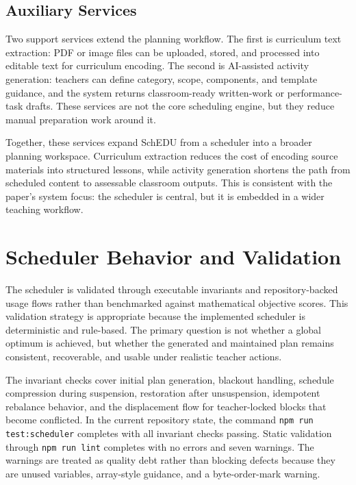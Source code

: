 \documentclass[conference]{IEEEtran}
\begin{document}
\subsection{Auxiliary Services}

Two support services extend the planning workflow. The first is curriculum text
extraction: PDF or image files can be uploaded, stored, and processed into editable
text for curriculum encoding. The second is AI-assisted activity generation:
teachers can define category, scope, components, and template guidance, and the
system returns classroom-ready written-work or performance-task drafts. These
services are not the core scheduling engine, but they reduce manual preparation
work around it.

Together, these services expand SchEDU from a scheduler into a broader planning
workspace. Curriculum extraction reduces the cost of encoding source materials into
structured lessons, while activity generation shortens the path from scheduled
content to assessable classroom outputs. This is consistent with the paper's system
focus: the scheduler is central, but it is embedded in a wider teaching workflow.

\section{Scheduler Behavior and Validation}

The scheduler is validated through executable invariants and repository-backed
usage flows rather than benchmarked against mathematical objective scores. This
validation strategy is appropriate because the implemented scheduler is
deterministic and rule-based. The primary question is not whether a global optimum
is achieved, but whether the generated and maintained plan remains consistent,
recoverable, and usable under realistic teacher actions.

The invariant checks cover initial plan generation, blackout handling, schedule
compression during suspension, restoration after unsuspension, idempotent rebalance
behavior, and the displacement flow for teacher-locked blocks that become
conflicted. In the current repository state, the command \texttt{npm run
test:scheduler} completes with all invariant checks passing. Static validation
through \texttt{npm run lint} completes with no errors and seven warnings. The
warnings are treated as quality debt rather than blocking defects because they are
unused variables, array-style guidance, and a byte-order-mark warning.
\end{document}
